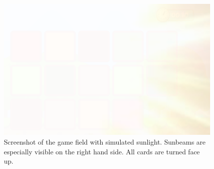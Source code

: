 \begin{figure}[H]
	\centering
	\includegraphics[width=15cm]{images/glareEffect.png}
	\caption[Bild kurz]{Screenshot of the game field with simulated sunlight. Sunbeams are especially visible on the right hand side. All cards are turned face up.}
	\label{fig:glareEffect}
\end{figure}

